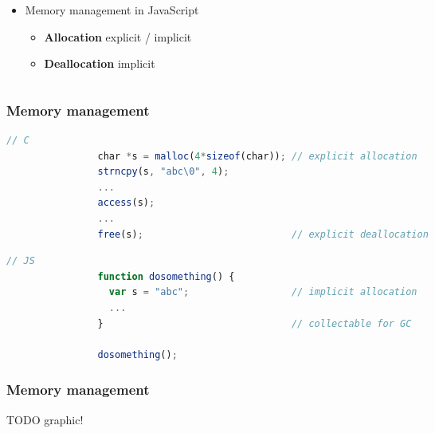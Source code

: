 \begin{frame}
\begin{columns}
\begin{column}{.7\linewidth}
\begin{itemize}
					\pause
		
					\item Memory management in JavaScript
					\begin{itemize}	
						\item \textbf{Allocation} explicit / implicit
						\item \textbf{Deallocation} implicit %
					\end{itemize}
				\end{itemize}
			\end{column}
		\end{columns}
	\end{frame}
	
	\begin{frame}[fragile]
		\frametitle{Memory management}
		\begin{footnotesize}
			\begin{lstlisting}[language=JavaScript]
				// C
				char *s = malloc(4*sizeof(char)); // explicit allocation
				strncpy(s, "abc\0", 4);
				...
				access(s);
				...
				free(s);                          // explicit deallocation
			\end{lstlisting}			
			
			\pause
			
			\begin{lstlisting}[language=JavaScript]
				// JS
				function dosomething() {
				  var s = "abc";                  // implicit allocation
				  ...
				}                                 // collectable for GC 
				
				dosomething();
			\end{lstlisting} %
		\end{footnotesize}		
	\end{frame}
	
	\begin{frame}
		\frametitle{Memory management}
		TODO graphic!
	\end{frame}
	
